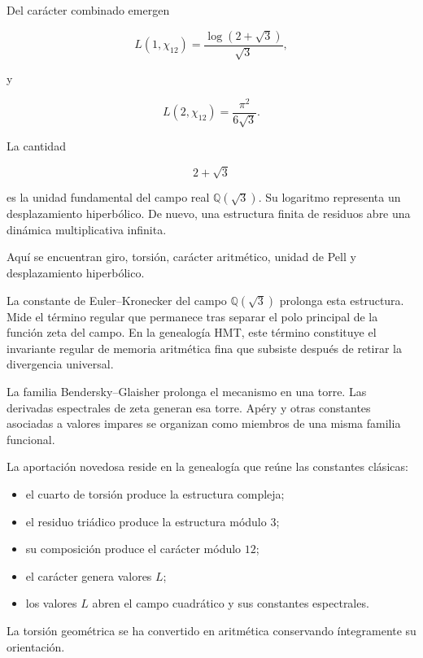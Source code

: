 Del carácter combinado emergen\par

\[
L(1,\chi_{12})
=
\frac{\log(2+\sqrt3)}{\sqrt3},
\]

y\par

\[
L(2,\chi_{12})
=
\frac{\pi^2}{6\sqrt3}.
\]

La cantidad\par

\[
2+\sqrt3
\]

es la unidad fundamental del campo real \(\mathbb Q(\sqrt3)\). Su logaritmo representa un desplazamiento hiperbólico. De nuevo, una estructura finita de residuos abre una dinámica multiplicativa infinita.\par

Aquí se encuentran giro, torsión, carácter aritmético, unidad de Pell y desplazamiento hiperbólico.\par

La constante de Euler–Kronecker del campo \(\mathbb Q(\sqrt3)\) prolonga esta estructura. Mide el término regular que permanece tras separar el polo principal de la función zeta del campo. En la genealogía HMT, este término constituye el invariante regular de memoria aritmética fina que subsiste después de retirar la divergencia universal.\par

La familia Bendersky–Glaisher prolonga el mecanismo en una torre. Las derivadas espectrales de zeta generan esa torre. Apéry y otras constantes asociadas a valores impares se organizan como miembros de una misma familia funcional.\par

La aportación novedosa reside en la genealogía que reúne las constantes clásicas:\par

\begin{itemize}[leftmargin=*,itemsep=0.35em]
\item el cuarto de torsión produce la estructura compleja;
\item el residuo triádico produce la estructura módulo \(3\);
\item su composición produce el carácter módulo \(12\);
\item el carácter genera valores \(L\);
\item los valores \(L\) abren el campo cuadrático y sus constantes espectrales.
\end{itemize}

La torsión geométrica se ha convertido en aritmética conservando íntegramente su orientación.\par
